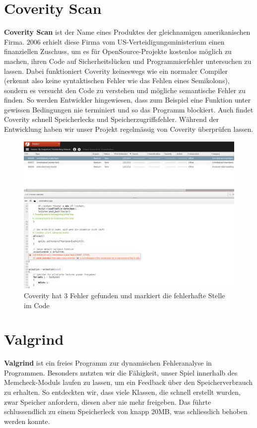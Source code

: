 \documentclass[11pt,a4paper]{scrbook}
\begin{document}
\section{Coverity Scan}
\textbf{Coverity Scan} ist der Name eines Produktes der gleichnamigen amerikanischen Firma. 2006 erhielt diese Firma vom US-Verteidigungsministerium
einen finanziellen Zuschuss, um es für OpenSource-Projekte kostenlos möglich zu machen, ihren Code auf Sicherheitslücken und Programmierfehler untersuchen
zu lassen. Dabei funktioniert Coverity keineswegs wie ein normaler Compiler (erkennt also keine syntaktischen Fehler wie das Fehlen eines Semikolons),
sondern es versucht den Code zu verstehen und mögliche semantische Fehler zu finden. So werden Entwickler hingewiesen, dass zum Beispiel eine Funktion
unter gewissen Bedingungen nie terminiert und so das Programm blockiert. Auch findet Coverity schnell Speicherlecks und Speicherzugriffsfehler.
Während der Entwicklung haben wir unser Projekt regelmässig von Coverity überprüfen lassen.
\begin{figure}
\centering
\includegraphics[scale=0.4]{img/coverity.png}
\caption{Coverity hat 3 Fehler gefunden und markiert die fehlerhafte Stelle im Code}
\end{figure}

\section{Valgrind}
\textbf{Valgrind} ist ein freies Programm zur dynamischen Fehleranalyse in Programmen. Besonders nutzten wir die Fähigkeit,
unser Spiel innerhalb des Memcheck-Moduls laufen zu lassen, um ein Feedback über den Speicherverbrauch zu erhalten. So entdeckten
wir, dass viele Klassen, die schnell erstellt wurden, zwar Speicher anfordern, diesen aber nie mehr freigeben. 
Das führte schlussendlich zu einem Speicherleck von knapp 20MB, was schliesslich behoben werden konnte.
\end{document}
